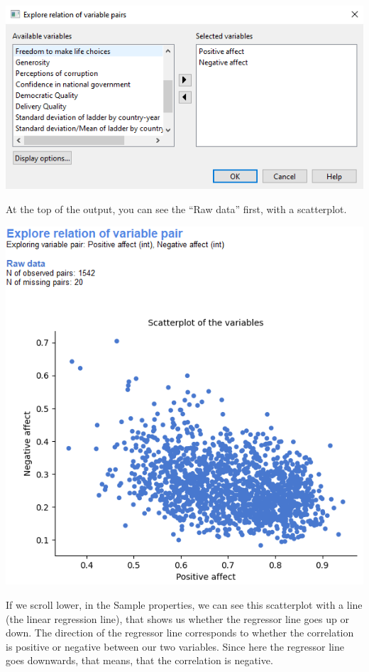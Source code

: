 \documentclass[
]{book}
\begin{document}
\includegraphics{img/ch3/vpposnegeff.png}

At the top of the output, you can see the ``Raw data'' first, with a scatterplot.

\includegraphics{img/ch3/vpposnegeff2.png}

If we scroll lower, in the Sample properties, we can see this scatterplot with a line (the linear regression line), that shows us whether the regressor line goes up or down. The direction of the regressor line corresponds to whether the correlation is positive or negative between our two variables. Since here the regressor line goes downwards, that means, that the correlation is negative.
\end{document}
